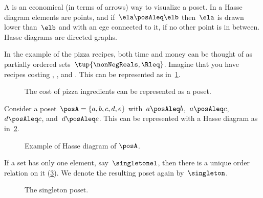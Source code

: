 A \emph{} is an economical (in terms of arrows) way to visualize a poset. In a Hasse diagram elements are points, and if~$\ela \posAleq \elb$ then~$\ela$ is drawn lower than~$\elb$ and with an ege connected to it, if no other point is in between. Hasse diagrams are directed graphs.

In the example of the pizza recipes, both time and money can be thought of as partially ordered sets~$\tup{\nonNegReals,\Rleq}$. Imagine that you have recipes costing \unit[1]{\stdcurr}, \unit[2]{\stdcurr}, and \unit[3]{\stdcurr}. This can be represented as in~\cref{fig:hassepizza}.

\begin{figure}[h!]
  \begin{center}
    \caption{The cost of pizza ingredients can be represented as a poset.}
    \label{fig:hassepizza}
  \end{center}
\end{figure}


\begin{example}
  Consider a poset~$\posA=\{a,b,c,d,e\}$ with~$a\posAleq b$,~$a\posAleq c$,~$d\posAleq c$, and~$d\posAleq e$.
  This can be represented with a Hasse diagram as in~\cref{fig:hasse}.
\end{example}

\begin{figure}[h!]
  \centering
  \caption{Example of Hasse diagram of $\posA$. }
  \label{fig:hasse}
\end{figure}

\begin{example}
  \label{ex:singleton}
  If a set has only one element, say~$\singletonel$, then there is a unique order relation on it (\cref{fig:singleton}).
  We denote the resulting poset again by~$\singleton$.
\end{example}
\begin{figure}[h!]
  \centering
  \caption{The singleton poset.}
  \label{fig:singleton}
\end{figure}


